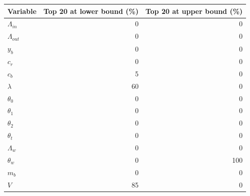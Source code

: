 \begin{tabular}{@{}lrr@{}}
\toprule
Variable & Top 20 at lower bound (\%) & Top 20 at upper bound (\%) \\
\midrule
$\Lambda_{in}$ & 0 & 0 \\
$\Lambda_{out}$ & 0 & 0 \\
$y_b$ & 0 & 0 \\
$c_r$ & 0 & 0 \\
$c_b$ & 5 & 0 \\
$\lambda$ & 60 & 0 \\
$\theta_0$ & 0 & 0 \\
$\theta_1$ & 0 & 0 \\
$\theta_2$ & 0 & 0 \\
$\theta_t$ & 0 & 0 \\
$\Lambda_w$ & 0 & 0 \\
$\theta_w$ & 0 & 100 \\
$m_b$ & 0 & 0 \\
$V$ & 85 & 0 \\
\bottomrule
\end{tabular}
